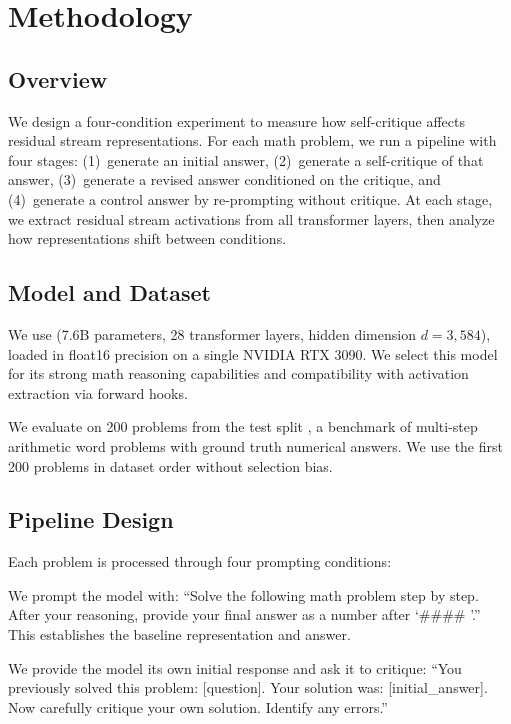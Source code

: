 \section{Methodology}
\label{sec:method}

\subsection{Overview}
\label{sec:method:overview}

We design a four-condition experiment to measure how self-critique affects residual stream representations. For each math problem, we run a pipeline with four stages: (1)~generate an initial answer, (2)~generate a self-critique of that answer, (3)~generate a revised answer conditioned on the critique, and (4)~generate a control answer by re-prompting without critique. At each stage, we extract residual stream activations from all transformer layers, then analyze how representations shift between conditions.

\subsection{Model and Dataset}
\label{sec:method:model}

We use \qwen (7.6B parameters, 28 transformer layers, hidden dimension $d = 3{,}584$), loaded in float16 precision on a single NVIDIA RTX 3090. We select this model for its strong math reasoning capabilities and compatibility with activation extraction via forward hooks.

We evaluate on 200 problems from the \gsmk test split \cite{cobbe2021gsm8k}, a benchmark of multi-step arithmetic word problems with ground truth numerical answers. We use the first 200 problems in dataset order without selection bias.

\subsection{Pipeline Design}
\label{sec:method:pipeline}

Each problem is processed through four prompting conditions:

 We prompt the model with: ``Solve the following math problem step by step. After your reasoning, provide your final answer as a number after `\#\#\#\# '.'' This establishes the baseline representation and answer.

 We provide the model its own initial response and ask it to critique: ``You previously solved this problem: [question]. Your solution was: [initial\_answer]. Now carefully critique your own solution. Identify any errors.''

